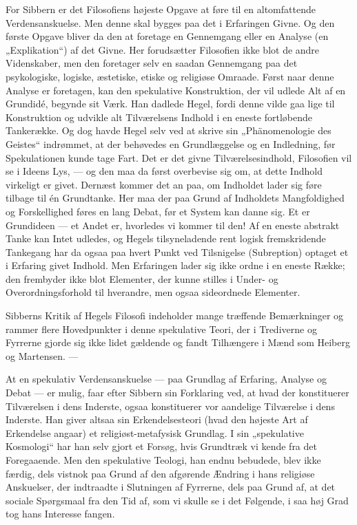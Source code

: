 \documentclass[12pt,a4paper,openany]{book}
\newcommand{\opage}[1]{\marginnote{\footnotesize\textit{[#1]}}}
\begin{document}
\setcounter{footnote}{0}%
\opage{110}For Sibbern er det Filosofiens højeste Opgave at føre til en
altomfattende Verdensanskuelse. Men denne skal bygges paa det i Erfaringen
Givne. Og den første Opgave bliver da den at foretage en Gennemgang eller en
Analyse (en „Explikation“) af det Givne. Her forudsætter Filosofien ikke blot
de andre Videnskaber, men den foretager selv en saadan Gennemgang paa det
psykologiske, logiske, æstetiske, etiske og religiøse Omraade. Først naar denne
Analyse er foretagen, kan den spekulative Konstruktion, der vil udlede Alt af
en Grundidé, begynde sit Værk. Han dadlede Hegel, fordi denne vilde gaa lige
til Konstruktion og udvikle alt Tilværelsens Indhold i en eneste fortløbende
Tankerække. Og dog havde Hegel selv ved at skrive sin „Phänomenologie des
Geistes“ indrømmet, at der behøvedes en Grundlæggelse og en Indledning, før
Spekulationen kunde tage Fart. Det er det givne Tilværelsesindhold, Filosofien
vil se i Ideens Lys, --- og den maa da først overbevise sig om, at dette
Indhold virkeligt er givet. Dernæst kommer det an paa, om Indholdet lader sig
føre tilbage til én Grundtanke. Her maa der paa Grund af Indholdets
Mangfoldighed og Forskellighed føres en lang Debat, før et System kan danne
sig. Et er Grundideen --- et Andet er, hvorledes vi kommer til den! Af en
eneste abstrakt Tanke kan Intet udledes, og Hegels tilsyneladende rent logisk
fremskridende Tankegang har da ogsaa paa hvert Punkt ved Tilsnigelse
(Subreption) optaget et i Erfaring givet Indhold. Men Erfaringen lader sig ikke
ordne i en eneste Række; den frembyder ikke blot Elementer, der kunne stilles i
Under- og Overordningsforhold til hverandre, men ogsaa sideordnede Elementer.

Sibberns Kritik af Hegels Filosofi indeholder mange træffende Bemærkninger og
rammer flere Hovedpunkter i denne spekulative Teori, der i Trediverne og
Fyrrerne gjorde sig ikke lidet gældende og fandt Tilhængere i Mænd som Heiberg
og Martensen. ---

At en spekulativ Verdensanskuelse --- paa Grundlag af Erfaring, Analyse og
Debat --- er mulig, faar efter Sibbern sin Forklaring ved, at hvad der
konstituerer Tilværelsen i
\setcounter{footnote}{0}%
\opage{111}dens Inderste, ogsaa konstituerer vor aandelige Tilværelse i dens
Inderste. Han giver altsaa sin Erkendelsesteori (hvad den højeste Art af
Erkendelse angaar) et religiøst-metafysisk Grundlag. I sin „spekulative
Kosmologi“ har han selv gjort et Forsøg, hvis Grundtræk vi kende fra det
Foregaaende. Men den spekulative Teologi, han endnu bebudede, blev ikke færdig,
dels vistnok paa Grund af den afgørende Ændring i hans religiøse Anskuelser,
der indtraadte i Slutningen af Fyrrerne, dels paa Grund af, at det sociale
Spørgsmaal fra den Tid af, som vi skulle se i det Følgende, i saa høj Grad tog
hans Interesse fangen.
\end{document}
